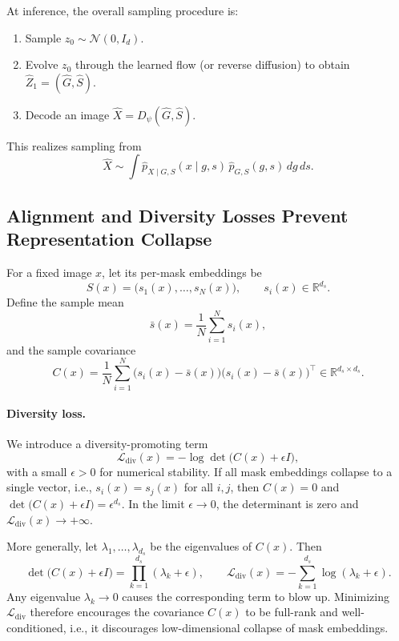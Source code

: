 \documentclass[12pt]{article}
\begin{document}
At inference, the overall sampling procedure is:
\begin{enumerate}
    \item Sample \(z_0 \sim \mathcal{N}(0, I_d)\).
    \item Evolve \(z_0\) through the learned flow (or reverse diffusion)
          to obtain \(\hat{Z}_1 = (\hat{G}, \hat{S})\).
    \item Decode an image \(\hat{X} = D_\psi(\hat{G}, \hat{S})\).
\end{enumerate}
This realizes sampling from
\[
\hat{X} \sim \int \hat{p}_{X \mid G,S}(x \mid g,s)\,
\hat{p}_{G,S}(g,s)\,dg\,ds.
\]

\subsection{Alignment and Diversity Losses Prevent Representation Collapse}

For a fixed image \(x\), let its per-mask embeddings be
\[
S(x) = \big(s_1(x), \dots, s_N(x)\big), \qquad
s_i(x) \in \mathbb{R}^{d_s}.
\]
Define the sample mean
\[
\bar{s}(x) = \frac{1}{N} \sum_{i=1}^N s_i(x),
\]
and the sample covariance
\[
C(x) = \frac{1}{N} \sum_{i=1}^N
\big(s_i(x) - \bar{s}(x)\big)\big(s_i(x) - \bar{s}(x)\big)^\top
\in \mathbb{R}^{d_s \times d_s}.
\]

\paragraph{Diversity loss.}
We introduce a diversity-promoting term
\[
\mathcal{L}_{\mathrm{div}}(x)
= - \log \det \big(C(x) + \epsilon I\big),
\]
with a small \(\epsilon > 0\) for numerical stability.
If all mask embeddings collapse to a single vector, i.e.,
\(s_i(x) = s_j(x)\) for all \(i,j\), then \(C(x) = 0\) and
\(\det\big(C(x) + \epsilon I\big) = \epsilon^{d_s}\).
In the limit \(\epsilon \to 0\),
the determinant is zero and \(\mathcal{L}_{\mathrm{div}}(x) \to +\infty\).

More generally, let \(\lambda_1, \dots, \lambda_{d_s}\) be the eigenvalues
of \(C(x)\).
Then
\[
\det\big(C(x) + \epsilon I\big)
= \prod_{k=1}^{d_s} (\lambda_k + \epsilon),
\qquad
\mathcal{L}_{\mathrm{div}}(x)
= - \sum_{k=1}^{d_s} \log (\lambda_k + \epsilon).
\]
Any eigenvalue \(\lambda_k \to 0\) causes the corresponding term
to blow up.
Minimizing \(\mathcal{L}_{\mathrm{div}}\) therefore encourages the
covariance \(C(x)\) to be full-rank and well-conditioned, i.e.,
it discourages low-dimensional collapse of mask embeddings.
\end{document}
